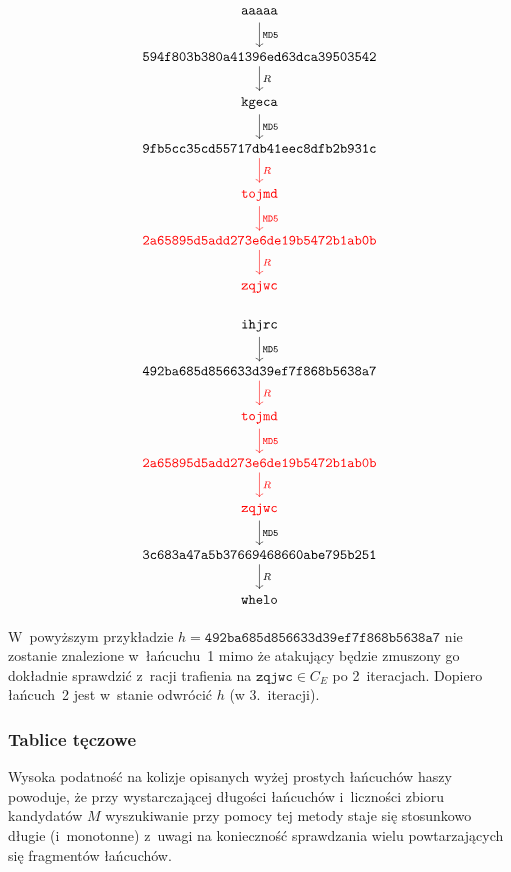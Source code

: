 \pagebreak
\newcommand{\tmp}{\vphantom{Kj}}
\begin{multicols}{2}
\begingroup
    \[
    \begin{tikzcd}
        \mathtt{aaaaa\tmp} \arrow{d}{\mathtt{MD5}} \\
        \mathtt{594f803b380a41396ed63dca39503542} \arrow{d}{R} \\
        \mathtt{kgeca\tmp} \arrow{d}{\mathtt{MD5}} \\
        \mathtt{9fb5cc35cd55717db41eec8dfb2b931c} \arrow[color=red]{d}{R} \\
        \mathtt{\textcolor{red}{tojmd\tmp}} \arrow[color=red]{d}{\mathtt{MD5}} \\
        \mathtt{\textcolor{red}{2a65895d5add273e6de19b5472b1ab0b}} \arrow[color=red]{d}{R} \\
        \mathtt{\textcolor{red}{zqjwc\tmp}}
    \end{tikzcd}
    \]
\endgroup

\begingroup
    \[
    \begin{tikzcd}
        \mathtt{ihjrc\tmp} \arrow{d}{\mathtt{MD5}} \\
        \mathtt{492ba685d856633d39ef7f868b5638a7} \arrow[color=red]{d}{R} \\
        \mathtt{\textcolor{red}{tojmd\tmp}} \arrow[color=red]{d}{\mathtt{MD5}} \\
        \mathtt{\textcolor{red}{2a65895d5add273e6de19b5472b1ab0b}} \arrow[color=red]{d}{R} \\
        \mathtt{\textcolor{red}{zqjwc\tmp}} \arrow{d}{\mathtt{MD5}} \\
        \mathtt{3c683a47a5b37669468660abe795b251} \arrow{d}{R} \\
        \mathtt{whelo\tmp}
    \end{tikzcd}
    \]
\endgroup
\end{multicols}

W~powyższym przykładzie $h = \mathtt{492ba685d856633d39ef7f868b5638a7}$ nie
zostanie znalezione w~łańcuchu~1 mimo że atakujący będzie zmuszony go dokładnie
sprawdzić z~racji trafienia na $\mathtt{zqjwc} \in C_E$ po 2~iteracjach.
Dopiero łańcuch~2 jest w~stanie odwrócić $h$ (w 3.~iteracji).



\subsubsection{Tablice tęczowe}
Wysoka podatność na kolizje opisanych wyżej prostych łańcuchów haszy powoduje,
że przy wystarczającej długości łańcuchów i~liczności zbioru kandydatów $M$
wyszukiwanie przy pomocy tej metody staje się stosunkowo długie (i~monotonne)
z~uwagi na konieczność sprawdzania wielu powtarzających się fragmentów
łańcuchów.

